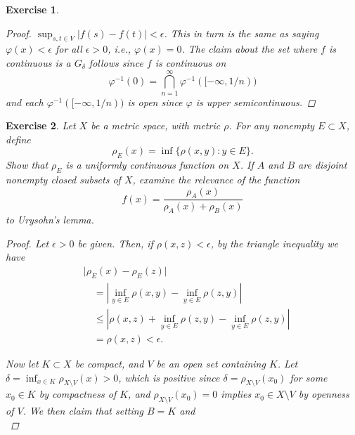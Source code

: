 \documentclass[10pt,letterpaper]{amsart}
\newtheorem{exercise}{Exercise}[section]
\theoremstyle{definition}
\theoremstyle{remark}
\numberwithin{equation}{exercise}
\begin{document}
\begin{multicols}{2}
\begin{exercise}
\begin{proof}
      $\sup_{s,t \in V} \lvert f(s) - f(t) \rvert < \epsilon$. This in turn is
      the same as saying $\varphi(x) < \epsilon$ for all $\epsilon > 0$, i.e.,
      $\varphi(x) = 0$. The claim about the set where $f$ is continuous is a
      $G_\delta$ follows since $f$ is continuous on
      \begin{equation*}
        \varphi^{-1}(0) = \bigcap_{n=1}^\infty \varphi^{-1}([-\infty,1/n)) 
      \end{equation*}
      and each $\varphi^{-1}([-\infty,1/n))$ is open since $\varphi$ is upper
      semicontinuous.
    \end{proof}
  \end{exercise}
  \begin{exercise}
    Let $X$ be a metric space, with metric $\rho$. For any nonempty $E \subset
    X$, define
    \begin{equation*}
      \rho_E(x) = \inf\{\rho(x,y) : y \in E\}.
    \end{equation*}
    Show that $\rho_E$ is a uniformly continuous function on $X$. If $A$ and $B$
    are disjoint nonempty closed subsets of $X$, examine the relevance of the
    function
    \begin{equation*}
      f(x) = \frac{\rho_A(x)}{\rho_A(x) + \rho_B(x)}
    \end{equation*}
    to Urysohn's lemma.
    \begin{proof}
      Let $\epsilon > 0$ be given. Then, if $\rho(x,z) < \epsilon$, by the
      triangle inequality we have
      \begin{align*}
        &\lvert \rho_E(x) - \rho_E(z) \rvert\\
        &\quad= \left\lvert \inf_{y \in E}
        \rho(x,y) - \inf_{y \in E} \rho(z,y) \right\rvert\\
        &\quad\le \left\lvert \rho(x,z) + \inf_{y \in E}
        \rho(z,y) - \inf_{y \in E} \rho(z,y) \right\rvert\\
        &\quad= \rho(x,z) < \epsilon.
      \end{align*}
      \par Now let $K \subset X$ be compact, and $V$ be an open set containing
      $K$. Let $\delta = \inf_{x \in K} \rho_{X \setminus V}(x) > 0$,
      which is positive since
      $\delta = \rho_{X \setminus V}(x_0)$ for some $x_0 \in K$ by compactness of
      $K$, and $\rho_{X \setminus V}(x_0) = 0$ implies $x_0 \in X \setminus V$
      by openness of $V$. We then claim that setting $B = K$ and
      \begin{equation*}

\end{equation*}
\end{proof}
\end{exercise}
\end{multicols}
\end{document}
